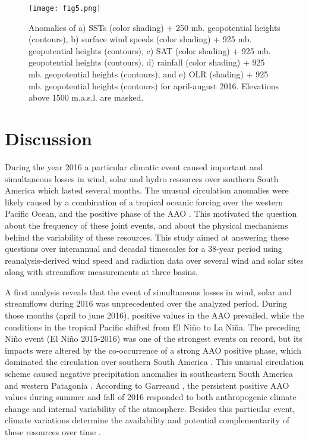 \documentclass[AMA,Times1COL]{WileyNJDv5} %
\begin{document}
\begin{linenumbers}
\begin{figure*}[hbpt]
	\centering
	\hspace*{-1cm}   
	\texttt{[image: fig5.png]}
	\caption{\label{2016} 
		Anomalies of a) SSTs (color shading) + 250 mb. geopotential heights (contours), b) surface wind speeds (color shading) + 925 mb. geopotential heights (contours), c) SAT (color shading) + 925 mb. geopotential heights (contours), d) rainfall (color shading) + 925 mb. geopotential heights (contours), and e) OLR (shading) + 925 mb. geopotential heights (contours) for april-august 2016. Elevations above 1500 m.a.s.l. are masked.}
\end{figure*}


\section{Discussion}

During the year 2016 a particular climatic event caused important and simultaneous losses in wind, solar and hydro resources over southern South America which lasted several months. The unusual circulation anomalies were likely caused by a combination of a tropical oceanic forcing over the western Pacific Ocean, and the positive phase of the AAO \cite{garreaud2018record,vera2018activity}. This motivated the question about the frequency of these joint events, and about the physical mechanisms behind the variability of these resources. This study aimed at answering these questions over interannual and decadal timescales for a 38-year period using reanalysis-derived wind speed and radiation data over several wind and solar sites along with streamflow measurements at three basins. 

A first analysis reveals that the event of simultaneous losses in wind, solar and streamflows during 2016 was unprecedented over the analyzed period. During those months (april to june 2016), positive values in the AAO prevailed, while the conditions in the tropical Pacific shifted from El Niño to La Niña. The preceding Niño event (El Niño 2015-2016) was one of the strongest events on record, but its impacts were altered by the co-occurrence of a strong AAO positive phase, which dominated the circulation over southern South America \cite{vera2018activity}. This unusual circulation scheme caused negative precipitation anomalies in southeastern South America and western Patagonia \cite{vera2018activity, garreaud2018record}. According to Garreaud \cite{garreaud2018record}, the persistent positive AAO values during summer and fall of 2016 responded to both anthropogenic climate change and internal variability of the atmosphere. Besides this particular event, climate variations determine the availability and potential complementarity of these resources over time \cite{gonzalez2022making}.


\end{linenumbers}
\end{document}
